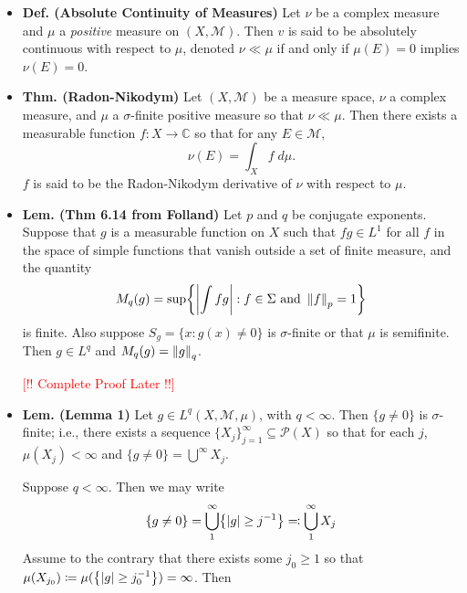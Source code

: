 \documentclass{article}
\begin{document}
\begin{itemize}
	\item \textbf{Def. (Absolute Continuity of Measures)} Let $\nu$ be a complex measure and $\mu$ a \textit{positive} measure on $(X, \mathscr{M})$. Then $v$ is said to be absolutely continuous with respect to $\mu$, denoted $\nu \ll \mu$ if and only if $\mu(E) = 0$ implies $\nu(E) = 0$. 
	\item \textbf{Thm. (Radon-Nikodym)} Let $(X, \mathscr{M})$ be a measure space, $\nu$ a complex measure, and $\mu$ a $\sigma$-finite positive measure so that $\nu \ll \mu$. Then there exists a measurable function $f: X \to \mathbb{C}$ so that for any $E \in \mathscr{M}$, 
	\begin{equation}
		\nu(E) = \int_{X}f\;d\mu. 
	\end{equation} 
	$f$ is said to be the Radon-Nikodym derivative of $\nu$ with respect to $\mu$. 
	\item \textbf{Lem. (Thm 6.14 from Folland)} Let $p$ and $q$ be conjugate exponents. Suppose that $g$ is a measurable function on $X$ such that $fg \in L^{1}$ for all $f$ in the space of simple functions that vanish outside a set of finite measure, and the quantity 
	\begin{equation}
		M_{q}(g) = \sup\brac*{\abs{\int fg}: f \in \Sigma \text{ and } \norm{f}_{p} = 1}
	\end{equation}
	is finite. Also suppose $S_{g} = \{x: g(x) \neq 0\}$ is $\sigma$-finite or that $\mu$ is semifinite. Then $g \in L^{q}$ and $M_{q}(g) = \norm{g}_{q}$. \newline 
	\begin{solutions}
		\textcolor{red}{[!! Complete Proof Later !!]}
	\end{solutions}
	\item \textbf{Lem. (Lemma 1)} Let $g \in L^{q}(X, \mathscr{M}, \mu)$, with $q < \infty$. Then $\{g \neq 0\}$ is $\sigma$-finite; i.e., there exists a sequence $\{X_{j}\}_{j= 1}^{\infty} \subseteq \mathscr{P}(X)$ so that for each $j$, $\mu(X_{j}) < \infty$ and $\{g \neq 0\} = \bigcup^{\infty}X_{j}$. \newline 
	\begin{solutions}
		Suppose $q < \infty$. Then we may write 
		\begin{equation}
			\brac*{g \neq 0} = \bigcup_{1}^{\infty}\brac*{\abs{g} \geq j^{-1}} \eqqcolon \bigcup_{1}^{\infty}X_{j}
		\end{equation}
		Assume to the contrary that there exists some $j_{0} \geq 1$ so that $\mu(X_{j_{0}}) \coloneqq \mu(\brac*{\abs{g} \geq j_{0}^{-1}}) = \infty$. Then 

\end{solutions}
\end{itemize}
\end{document}
